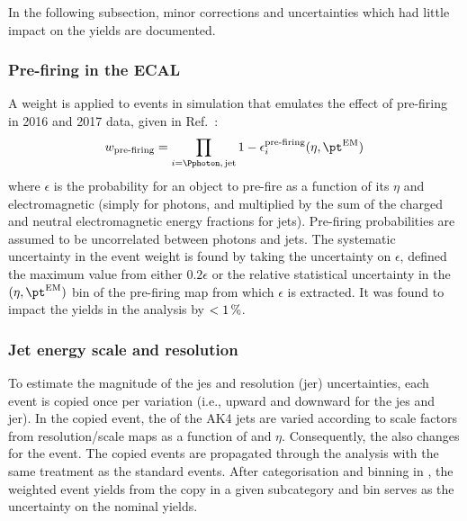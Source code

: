 In the following subsection, minor corrections and uncertainties which had little impact on the yields are documented.




\subsubsection{Pre-firing in the ECAL}
\label{subsubsec:htoinv_ecal_prefiring_weight}

A weight is applied to events in simulation that emulates the effect of pre-firing in 2016 and 2017 data, given in Ref.~:
\begin{equation}
    w_{\text{pre-firing}} = \prod_{i = \Pphoton,\, \mathrm{jet}} 1 - \epsilon_i^{\text{pre-firing}}(\eta, \pt^{\mathrm{EM}})
    \label{eq:prefiring_weight}
\end{equation}
where $\epsilon$ is the probability for an object to pre-fire as a function of its $\eta$ and electromagnetic \pt (simply \pt for photons, and \pt multiplied by the sum of the charged and neutral electromagnetic energy fractions for \glspl{jet}). Pre-firing probabilities are assumed to be uncorrelated between photons and jets. The systematic uncertainty in the event weight is found by taking the uncertainty on $\epsilon$, defined the maximum value from either $\text{0.2}\epsilon$ or the relative statistical uncertainty in the $(\eta, \pt^{\mathrm{EM}})$ bin of the pre-firing map from which $\epsilon$ is extracted. It was found to impact the yields in the analysis by $< \text{1\,\%}$.





\subsubsection{Jet energy scale and resolution}
\label{subsubsec:htoinv_JES_JER_systs}

To estimate the magnitude of the \acrfull{jes} and resolution (\acrshort{jer}) uncertainties, each event is copied once per variation (i.e., upward and downward for the \acrshort{jes} and \acrshort{jer}). In the copied event, the \pt of the AK4 \glspl{jet} are varied according to scale factors from resolution/scale maps as a function of \pt and $\eta$. Consequently, the \ptvecmiss also changes for the event. The copied events are propagated through the analysis with the same treatment as the standard events. After categorisation and binning in \ptmiss, the weighted event yields from the copy in a given subcategory and \ptmiss bin serves as the uncertainty on the nominal yields.

